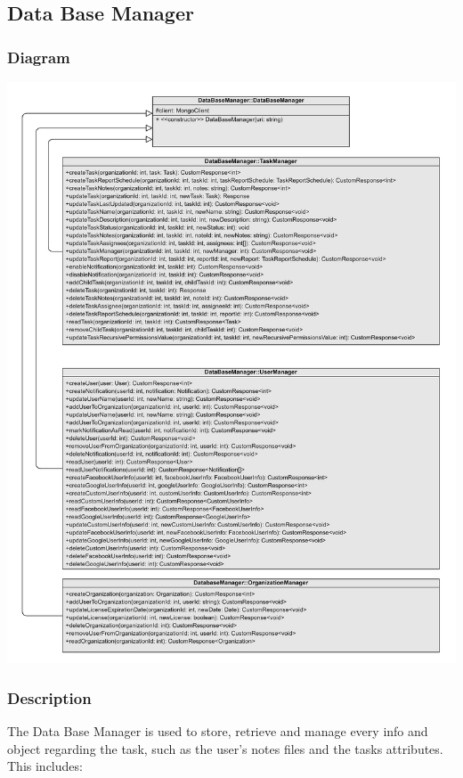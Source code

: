 \documentclass{article}
\begin{document}
\subsection{Data Base Manager} %

\subsubsection{Diagram}


\includegraphics[width=\textwidth,height=\textheight,keepaspectratio]{images/class_diagram/database_manager.jpg}

\subsubsection{Description}

The Data Base Manager is used to store, retrieve and manage every info and object regarding the task, such as the user's notes files and the tasks attributes.
This includes:
\end{document}
